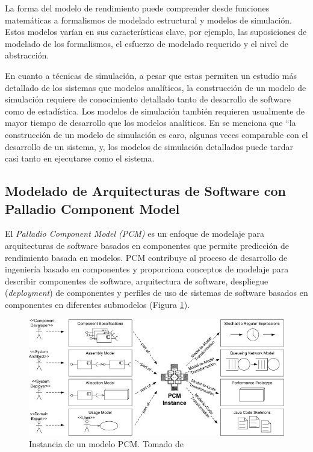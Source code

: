 \documentclass[article]{IEEEtran}
\begin{document}
La forma del modelo de rendimiento puede comprender desde funciones matemáticas a formalismos de modelado estructural y modelos de simulación. Estos modelos varían en sus características clave, por ejemplo, las suposiciones de modelado de los formalismos, el esfuerzo de modelado requerido y el nivel de abstracción.

En cuanto a técnicas de simulación, a pesar que estas permiten un estudio más detallado de los sistemas que modelos analíticos, la construcción de un modelo de simulación requiere de conocimiento detallado tanto de desarrollo de software como de estadística\cite{thijmen-thesis}. Los modelos de simulación también requieren usualmente de mayor tiempo de desarrollo que los modelos analíticos. En \cite{woodside-et-al} se menciona que ``la construcción de un modelo de simulación es caro, algunas veces comparable con el desarrollo de un sistema, y, los modelos de simulación detallados puede tardar casi tanto en ejecutarse como el sistema.

\subsection{Modelado de Arquitecturas de Software con Palladio Component Model}
El \emph{Palladio Component Model (PCM)} es un enfoque de modelaje para arquitecturas de software basados en componentes que permite predicción de rendimiento basada en modelos. PCM contribuye al proceso de desarrollo de ingeniería basado en componentes y proporciona conceptos de modelaje para describir componentes de software, arquitectura de software, despliegue (\emph{deployment}) de componentes y perfiles de uso de sistemas de software basados en componentes en diferentes submodelos (Figura \ref{fig:pcm-instance}).

\begin{figure}[h]
  \centering
  \includegraphics[width=12cm]{palladio-cbse-process}
  \caption{\small{Instancia de un modelo PCM. Tomado de \cite{happe-et-al}}}
  \label{fig:pcm-instance}
\end{figure} 
\end{document}
